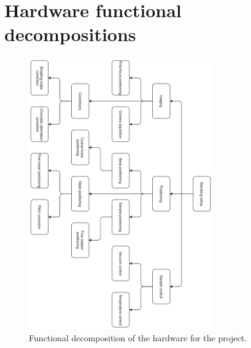 \documentclass[10pt]{article}
\begin{document}
\clearpage
\appendix

\section{Hardware functional decompositions}

\label{ap:hardware_functional_decomposition}
\begin{figure}[htp]
  \centering
  \includegraphics[width=0.7\textwidth]{img/design_cycle/functional_decomposition_hardware.png}
  \caption{Functional decomposition of the hardware for the project.}
  \label{fig:functional_decomposition_hardware}
\end{figure}

\clearpage
\end{document}
